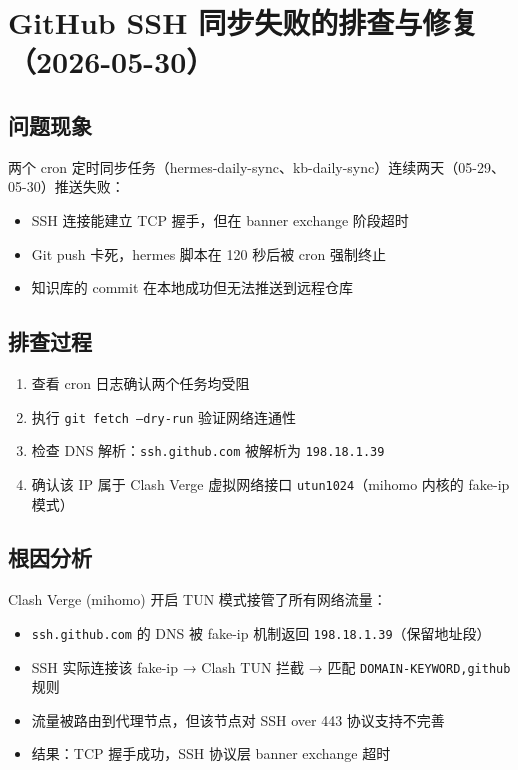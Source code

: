 \section{GitHub SSH 同步失败的排查与修复（2026-05-30）}

\subsection{问题现象}
两个 cron 定时同步任务（hermes-daily-sync、kb-daily-sync）连续两天（05-29、05-30）推送失败：
\begin{itemize}
  \item SSH 连接能建立 TCP 握手，但在 banner exchange 阶段超时
  \item Git push 卡死，hermes 脚本在 120 秒后被 cron 强制终止
  \item 知识库的 commit 在本地成功但无法推送到远程仓库
\end{itemize}

\subsection{排查过程}
\begin{enumerate}
  \item 查看 cron 日志确认两个任务均受阻
  \item 执行 \texttt{git fetch --dry-run} 验证网络连通性
  \item 检查 DNS 解析：\texttt{ssh.github.com} 被解析为 \texttt{198.18.1.39}
  \item 确认该 IP 属于 Clash Verge 虚拟网络接口 \texttt{utun1024}（mihomo 内核的 fake-ip 模式）
\end{enumerate}

\subsection{根因分析}
Clash Verge (mihomo) 开启 TUN 模式接管了所有网络流量：
\begin{itemize}
  \item \texttt{ssh.github.com} 的 DNS 被 fake-ip 机制返回 \texttt{198.18.1.39}（保留地址段）
  \item SSH 实际连接该 fake-ip → Clash TUN 拦截 → 匹配 \texttt{DOMAIN-KEYWORD,github} 规则
  \item 流量被路由到代理节点，但该节点对 SSH over 443 协议支持不完善
  \item 结果：TCP 握手成功，SSH 协议层 banner exchange 超时
\end{itemize}

